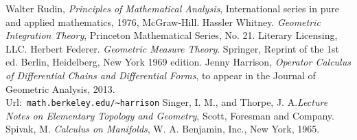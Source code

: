 \documentclass[12pt,a4paper]{article}
\begin{document}
%
%
%
\begin{thebibliography}{1}
%
 Walter Rudin,
  {\em Principles of Mathematical Analysis},
  International series in pure and applied mathematics,
  1976, McGraw-Hill.
 Hassler Whitney. {\em Geometric Integration Theory},
  Princeton Mathematical Series, No. 21. Literary Licensing, LLC.
 Herbert Federer. {\em Geometric Measure Theory}. Springer,        
  Reprint of the 1st ed. Berlin, Heidelberg, New York 1969 edition.
 Jenny Harrison, {\em Operator Calculus of Differential
  Chains and Differential Forms}, to appear in the Journal of Geometric
  Analysis, 2013. \\
  Url:\ {\small {\tt math.berkeley.edu/\textasciitilde harrison}}
 Singer, I. M., and Thorpe, J. A.{\em Lecture Notes on 
  Elementary Topology and Geometry}, Scott, Foresman and Company. 
 Spivak, M. {\em Calculus on Manifolds}, W. A. Benjamin, 
  Inc., New York, 1965. 
\end{thebibliography}
%
\end{document}
